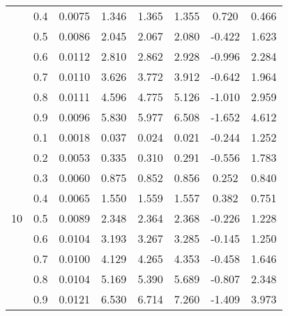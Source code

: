 \documentclass[11pt,a4paper]{report}
\begin{document}
\begin{longtable}{ | c | c || c | c | c | c | c | c | }
 & 0.4 & 0.0075 & 1.346 & 1.365 & 1.355 & 0.720 & 0.466 \\
 & 0.5 & 0.0086 & 2.045 & 2.067 & 2.080 & -0.422 & 1.623 \\
 & 0.6 & 0.0112 & 2.810 & 2.862 & 2.928 & -0.996 & 2.284 \\
 & 0.7 & 0.0110 & 3.626 & 3.772 & 3.912 & -0.642 & 1.964 \\
 & 0.8 & 0.0111 & 4.596 & 4.775 & 5.126 & -1.010 & 2.959 \\
 & 0.9 & 0.0096 & 5.830 & 5.977 & 6.508 & -1.652 & 4.612 \\
 \hline
\multirow{9}{*}{10} & 0.1 & 0.0018 & 0.037 & 0.024 & 0.021 & -0.244 & 1.252 \\
 & 0.2 & 0.0053 & 0.335 & 0.310 & 0.291 & -0.556 & 1.783 \\
 & 0.3 & 0.0060 & 0.875 & 0.852 & 0.856 & 0.252 & 0.840 \\
 & 0.4 & 0.0065 & 1.550 & 1.559 & 1.557 & 0.382 & 0.751 \\
 & 0.5 & 0.0089 & 2.348 & 2.364 & 2.368 & -0.226 & 1.228 \\
 & 0.6 & 0.0104 & 3.193 & 3.267 & 3.285 & -0.145 & 1.250 \\
 & 0.7 & 0.0100 & 4.129 & 4.265 & 4.353 & -0.458 & 1.646 \\
 & 0.8 & 0.0104 & 5.169 & 5.390 & 5.689 & -0.807 & 2.348 \\
 & 0.9 & 0.0121 & 6.530 & 6.714 & 7.260 & -1.409 & 3.973 \\
 \hline
\hline
\end{longtable}
\end{document}
